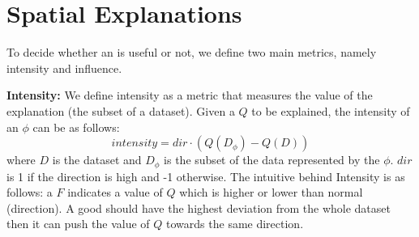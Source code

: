 
\section{Spatial Explanations}

To decide whether an {\explanation} is useful or not, we define two main metrics, namely intensity and influence. 

{\bf Intensity:} We define intensity as a metric that measures the {\fact} value of the explanation (the subset of a dataset). Given a {\fact} $Q$ to be explained, the intensity of an {\explanation} $\phi$ can be as follows:
$$intensity = dir \cdot (Q (D_\phi) - Q(D)) $$
where $D$ is the dataset and $D_\phi$ is the subset of the data represented by the {\explanation} $\phi$. $dir$ is 1 if the direction is high and -1 otherwise. 
The intuitive behind Intensity is as follows: a {\fact} $F$ indicates a value of $Q$ which is higher or lower than normal (direction). A good {\explanation} should have the highest deviation from the whole dataset then it can push the value of $Q$ towards the same direction. 


